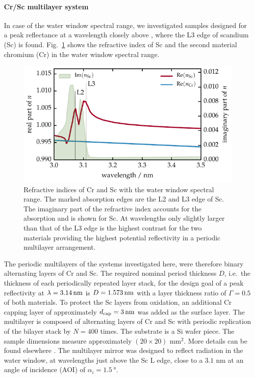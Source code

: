 \paragraph{Cr/Sc multilayer system}
In case of the water window spectral range, we investigated samples designed for a peak reflectance at a wavelength closely above , where the L3 edge of scandium (Sc) is found. Fig.~\ref{ch_exp:fig_crsc_contrast} shows the refractive index of Sc and the second material chromium (Cr) in the water window spectral range. 
\begin{figure}[htb]
        \includegraphics{img/Cr_Sc_contrast}
        \caption[Refractive indices of Cr and Sc in the water window.]{%
            Refractive indices of Cr and Sc with the water window spectral range. The marked absorption edges are the L2 and L3 edge of Sc. The imaginary part of the refractive index accounts for the absorption and is shown for Sc. At wavelengths only slightly larger than that of the L3 edge is the highest contrast for the two materials providing the highest potential reflectivity in a periodic multilayer arrangement.}
        \label{ch_exp:fig_crsc_contrast}
\end{figure}
The periodic multilayers of the systems investigated here, were therefore binary alternating layers of Cr and Sc. The required nominal period thickness $D$, i.e.~the thickness of each periodically repeated layer stack, for the design goal of a peak reflectivity at $\lambda=\nm{3.14}$ is $D=\nm{1.573}$ with a layer thickness ratio of $\Gamma=0.5$ of both materials. To protect the Sc layers from oxidation, an additional Cr capping layer of approximately $d_\text{cap} = \nm{3}$ was added as the surface layer. The multilayer is composed of alternating layers of Cr and Sc with periodic replication of the bilayer stack by $N=400$ times. The substrate is a Si wafer piece. The sample dimensions measure 
approximately $(20 \times 20)$ mm$^2$. More details can be found elsewhere \cite{prasciolu_thermal_2014}. The multilayer mirror was designed to reflect radiation in the water window, at wavelengths just above the Sc L edge, close to a $3.1$ nm at an angle of incidence (AOI) of $\alpha_i = \SI{1.5}{\degree}$.


